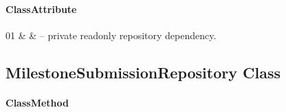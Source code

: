 \paragraph{ClassAttribute}
\begin{ClassAttributeTable}
01 &  &  -- private readonly repository dependency. \\ \hline
\end{ClassAttributeTable}

\subsection{MilestoneSubmissionRepository Class}

\paragraph{ClassMethod}

